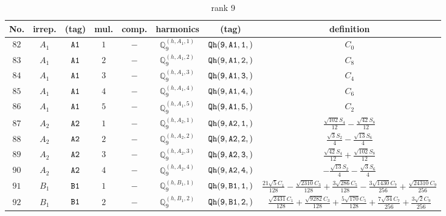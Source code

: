 \documentclass[fleqn,8pt]{jsarticle}
\begin{document}
\begin{table}[ht!]
\begin{center}
\caption{rank 9}
\renewcommand{\arraystretch}{1.3}
\begin{tabular}{cccccccc} \hline \hline
No. & irrep. & (tag) & mul. & comp. & harmonics & (tag) & definition \\ \hline
$ 82 $ & $ A_{1} $ & $ {\tt A1} $ & $ 1 $ & $ - $ & $ \mathbb{Q}_{9}^{(h,A_{1},1)} $ & $ {\tt Qh(9,A1,1,)} $ & $ C_{0} $ \\
$ 83 $ & $ A_{1} $ & $ {\tt A1} $ & $ 2 $ & $ - $ & $ \mathbb{Q}_{9}^{(h,A_{1},2)} $ & $ {\tt Qh(9,A1,2,)} $ & $ C_{8} $ \\
$ 84 $ & $ A_{1} $ & $ {\tt A1} $ & $ 3 $ & $ - $ & $ \mathbb{Q}_{9}^{(h,A_{1},3)} $ & $ {\tt Qh(9,A1,3,)} $ & $ C_{4} $ \\
$ 85 $ & $ A_{1} $ & $ {\tt A1} $ & $ 4 $ & $ - $ & $ \mathbb{Q}_{9}^{(h,A_{1},4)} $ & $ {\tt Qh(9,A1,4,)} $ & $ C_{6} $ \\
$ 86 $ & $ A_{1} $ & $ {\tt A1} $ & $ 5 $ & $ - $ & $ \mathbb{Q}_{9}^{(h,A_{1},5)} $ & $ {\tt Qh(9,A1,5,)} $ & $ C_{2} $ \\
$ 87 $ & $ A_{2} $ & $ {\tt A2} $ & $ 1 $ & $ - $ & $ \mathbb{Q}_{9}^{(h,A_{2},1)} $ & $ {\tt Qh(9,A2,1,)} $ & $ \frac{\sqrt{102} S_{4}}{12} - \frac{\sqrt{42} S_{8}}{12} $ \\
$ 88 $ & $ A_{2} $ & $ {\tt A2} $ & $ 2 $ & $ - $ & $ \mathbb{Q}_{9}^{(h,A_{2},2)} $ & $ {\tt Qh(9,A2,2,)} $ & $ \frac{\sqrt{3} S_{2}}{4} - \frac{\sqrt{13} S_{6}}{4} $ \\
$ 89 $ & $ A_{2} $ & $ {\tt A2} $ & $ 3 $ & $ - $ & $ \mathbb{Q}_{9}^{(h,A_{2},3)} $ & $ {\tt Qh(9,A2,3,)} $ & $ \frac{\sqrt{42} S_{4}}{12} + \frac{\sqrt{102} S_{8}}{12} $ \\
$ 90 $ & $ A_{2} $ & $ {\tt A2} $ & $ 4 $ & $ - $ & $ \mathbb{Q}_{9}^{(h,A_{2},4)} $ & $ {\tt Qh(9,A2,4,)} $ & $ - \frac{\sqrt{13} S_{2}}{4} - \frac{\sqrt{3} S_{6}}{4} $ \\
$ 91 $ & $ B_{1} $ & $ {\tt B1} $ & $ 1 $ & $ - $ & $ \mathbb{Q}_{9}^{(h,B_{1},1)} $ & $ {\tt Qh(9,B1,1,)} $ & $ \frac{21 \sqrt{5} C_{1}}{128} - \frac{\sqrt{2310} C_{3}}{128} + \frac{3 \sqrt{286} C_{5}}{128} - \frac{3 \sqrt{1430} C_{7}}{256} + \frac{\sqrt{24310} C_{9}}{256} $ \\
$ 92 $ & $ B_{1} $ & $ {\tt B1} $ & $ 2 $ & $ - $ & $ \mathbb{Q}_{9}^{(h,B_{1},2)} $ & $ {\tt Qh(9,B1,2,)} $ & $ \frac{\sqrt{2431} C_{1}}{128} + \frac{\sqrt{9282} C_{3}}{128} + \frac{5 \sqrt{170} C_{5}}{128} + \frac{7 \sqrt{34} C_{7}}{256} + \frac{3 \sqrt{2} C_{9}}{256} $ \\

\end{tabular}
\end{center}
\end{table}
\end{document}
